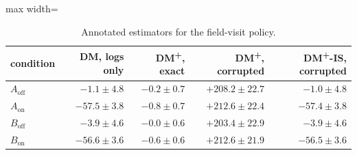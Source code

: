 \begin{table}[!htbp]
\centering
\caption{Annotated estimators for the field-visit policy.}
\label{tab:dmplus}
\footnotesize
\begin{adjustbox}{max width=\linewidth}
\begin{tabular}{lrrrr}
\toprule
condition & DM, logs only & DM\textsuperscript{+}, exact & DM\textsuperscript{+}, corrupted & DM\textsuperscript{+}-IS, corrupted \\
\midrule
$A_{\mathrm{off}}$ & $-1.1 \pm 4.8$ & $-0.2 \pm 0.7$ & $+208.2 \pm 22.7$ & $-1.0 \pm 4.8$ \\
$A_{\mathrm{on}}$ & $-57.5 \pm 3.8$ & $-0.8 \pm 0.7$ & $+212.6 \pm 22.4$ & $-57.4 \pm 3.8$ \\
$B_{\mathrm{off}}$ & $-3.9 \pm 4.6$ & $-0.0 \pm 0.6$ & $+203.4 \pm 22.9$ & $-3.9 \pm 4.6$ \\
$B_{\mathrm{on}}$ & $-56.6 \pm 3.6$ & $-0.6 \pm 0.6$ & $+212.6 \pm 21.9$ & $-56.5 \pm 3.6$ \\
\bottomrule
\end{tabular}
\end{adjustbox}
\end{table}
